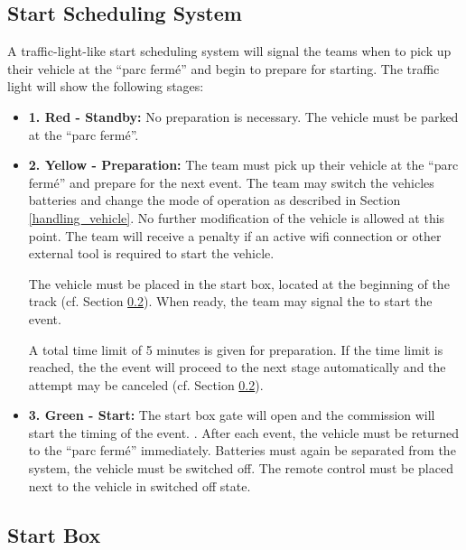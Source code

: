 \subsection{Start Scheduling System}
\label{start_scheduling}

A traffic-light-like start scheduling system will signal the teams when to pick
up their vehicle at the “parc fermé” and begin to prepare for starting. The
traffic light will show the following stages:

\begin{itemize}
	\item \textbf{1. Red - Standby:} \newline
	      No preparation is necessary. The vehicle must be parked at the “parc fermé”.

	\item \textbf{2. Yellow - Preparation:} \newline
	      The team must pick up their vehicle at the “parc fermé” and prepare for the next event. The team may switch the vehicles batteries and change the mode of operation as described in Section \ref{handling_vehicle}. No further modification of the vehicle is allowed at this point.
	      The team will receive a penalty if an active wifi connection or other external tool is required to start the vehicle.

	      The vehicle must be placed in the start box, located at the beginning of the
	      track (cf. Section \ref{start_box}). When ready, the team may signal the 
		   to start the event.

	      A total time limit of 5 minutes is given for preparation. If the time limit is
	      reached, the the event will proceed to the next stage automatically and the
	      attempt may be canceled (cf. Section \ref{start_box}).

	\item \textbf{3. Green - Start:} \newline
	      The start box gate will open and the commission will start the timing of the event.
	      . After each event, the vehicle must be returned to the “parc fermé” immediately. Batteries must again be separated from the system, the vehicle must be switched off. The remote control must be placed next to the vehicle in switched off state.
\end{itemize}

\subsection{Start Box}
\label{start_box}

